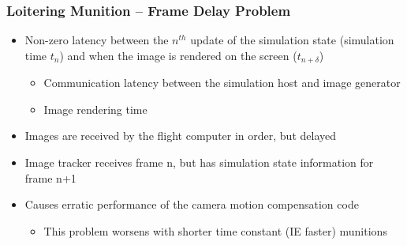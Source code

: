 \documentclass[aspectratio=169]{beamer}
\begin{document}
\begin{frame}
  \frametitle{Loitering Munition -- Frame Delay Problem}
  \begin{itemize}
  \item Non-zero latency between the $n^{th}$ update of the simulation
    state (simulation time $t_{n}$) and when the image is rendered on
    the screen ($t_{n+\delta}$)
    \begin{itemize}
    \item Communication latency between the simulation host and image
      generator
    \item Image rendering time
    \end{itemize}
  \item Images are received by the flight computer in order, but delayed
  \item Image tracker receives frame n, but has simulation state information for frame n+1
  \item Causes erratic performance of the camera motion compensation
    code
    \begin{itemize}
    \item This problem worsens with shorter time constant (IE faster)
      munitions
    \end{itemize}
  \end{itemize}
\end{frame}
\end{document}

